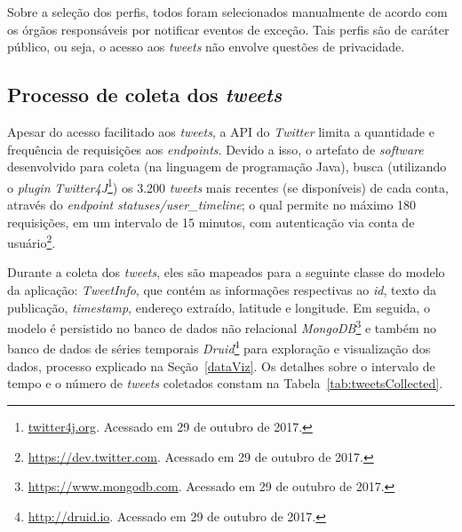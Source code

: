 \documentclass[
	12pt,				%
	oneside,			%
	a4paper,			%
	english,			%
	brazil				%
	]{abntex2ppgsi}
\begin{document}
{{{Sobre a seleção dos perfis, todos foram selecionados manualmente de acordo com os órgãos responsáveis por notificar eventos de exceção. Tais perfis são de caráter público, ou seja, o acesso aos \textit{tweets} não envolve questões de privacidade.

\subsection{Processo de coleta dos \textit{tweets}}

Apesar do acesso facilitado aos \textit{tweets}, a API do \textit{Twitter} limita a quantidade e frequência de requisições aos \textit{endpoints}. Devido a isso, o artefato de \textit{software} desenvolvido para coleta (na linguagem de programação Java), busca (utilizando o \textit{plugin} \textit{Twitter4J}\footnote{\url{twitter4j.org}. Acessado em 29 de outubro de 2017.}) os 3.200 \textit{tweets} mais recentes (se disponíveis) de cada conta, através do \textit{endpoint} \textit{statuses/user\_timeline}; o qual permite no máximo 180 requisições, em um intervalo de 15 minutos, com autenticação via conta de usuário\footnote{\url{https://dev.twitter.com}. Acessado em 29 de outubro de 2017.}.

Durante a coleta dos \textit{tweets}, eles são mapeados para a seguinte classe do modelo da aplicação: \textit{TweetInfo}, que contém as informações respectivas ao \textit{id}, texto da publicação, \textit{timestamp}, endereço extraído, latitude e longitude. Em seguida, o modelo é persistido no banco de dados não relacional \textit{MongoDB}\footnote{\url{https://www.mongodb.com}. Acessado em 29 de outubro de 2017.} e também no banco de dados de séries temporais \textit{Druid}\footnote{\url{http://druid.io}. Acessado em 29 de outubro de 2017.} para exploração e visualização dos dados, processo explicado na Seção~\ref{dataViz}. Os detalhes sobre o intervalo de tempo e o número de \textit{tweets} coletados constam na Tabela~\ref{tab:tweetsCollected}.

}}}
\end{document}
